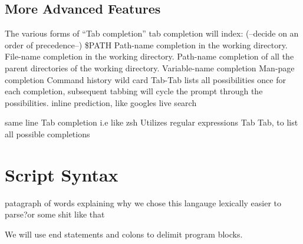 \documentclass[a4paper,11pt]{article}
\begin{document}
\subsection*{More Advanced Features}

The various forms of ``Tab completion''
tab completion will index: (--decide on an order of precedence--)
 \$PATH
 Path-name completion in the working directory.
 File-name completion in the working directory.
 Path-name completion of all the parent directories of the working directory.
 Variable-name completion
 Man-page completion
 Command history
wild card \*
Tab-Tab lists all possibilities once for each completion, subsequent tabbing will cycle the
prompt through the possibilities.
inline prediction, like googles live search

same line Tab completion i.e like zsh
Utilizes regular expressions
Tab Tab, to list all possible completions

\pagebreak
\section{Script Syntax}

patagraph of words explaining why we chose this langauge
lexically easier to parse?or some shit like that

We will use end statements and colons to delimit program blocks.
\end{document}

